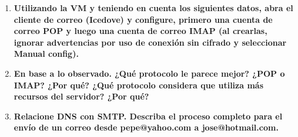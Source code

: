 \documentclass[a4paper,10pt]{article}
\begin{document}
\begin{enumerate}
   \item \textbf{Utilizando la VM y teniendo en cuenta los siguientes datos, abra el cliente de correo (Icedove) y configure, primero una cuenta de correo POP y luego una cuenta de correo IMAP (al crearlas, ignorar advertencias por uso de conexión sin cifrado y seleccionar Manual config).}
   
   \item \textbf{En base a lo observado. ¿Qué protocolo le parece mejor? ¿POP o IMAP? ¿Por qué? ¿Qué protocolo considera que utiliza más recursos del servidor? ¿Por qué?}
   
   \item \textbf{Relacione DNS con SMTP. Describa el proceso completo para el envío de un correo desde pepe@yahoo.com a jose@hotmail.com.}
   
   
\end{enumerate}
\end{document}
